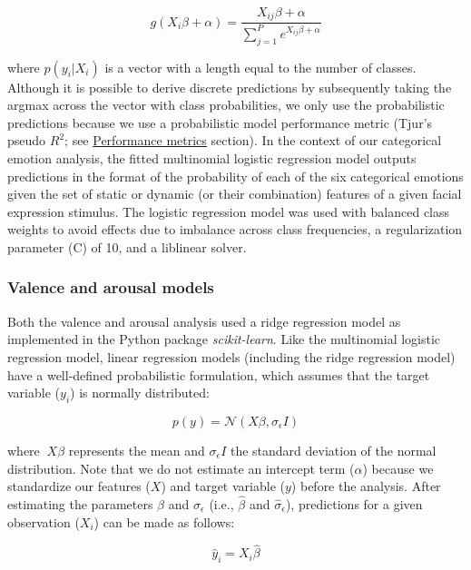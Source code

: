 \documentclass[11pt,american,]{memoir} %
\begin{document}
\begin{equation}
g(X_{i}\beta + \alpha) = \frac{X_{ij}\beta + \alpha}{\sum_{j=1}^{P}e^{X_{ij}\beta + \alpha}}
\end{equation}

where \(p(y_{i} | X_{i})\) is a vector with a length equal to the number of classes. Although it is possible to derive discrete predictions by subsequently taking the argmax across the vector with class probabilities, we only use the probabilistic predictions because we use a probabilistic model performance metric (Tjur's pseudo \(R^{2}\); see \protect\hyperlink{svsd-perf}{Performance metrics} section). In the context of our categorical emotion analysis, the fitted multinomial logistic regression model outputs predictions in the format of the probability of each of the six categorical emotions given the set of static or dynamic (or their combination) features of a given facial expression stimulus. The logistic regression model was used with balanced class weights to avoid effects due to imbalance across class frequencies, a regularization parameter (C) of 10, and a liblinear solver.

\hypertarget{svsd-valaro}{%
\subsubsection{Valence and arousal models}\label{svsd-valaro}}

Both the valence and arousal analysis used a ridge regression model as implemented in the Python package \emph{scikit-learn}. Like the multinomial logistic regression model, linear regression models (including the ridge regression model) have a well-defined probabilistic formulation, which assumes that the target variable (\(y_{i}\)) is normally distributed:

\begin{equation}
p(y) = \mathcal{N}(X\beta, \sigma_{\epsilon}I)
\end{equation}

where \(~X\beta\) represents the mean and \(\sigma_{\epsilon}I\) the standard deviation of the normal distribution. Note that we do not estimate an intercept term (\(\alpha\)) because we standardize our features (\(X\)) and target variable (\(y\)) before the analysis. After estimating the parameters \(\beta\) and \(\sigma_{\epsilon}\) (i.e., \(\hat{\beta}\) and \(\hat{\sigma}_{\epsilon}\)), predictions for a given observation (\(X_{i}\)) can be made as follows:

\begin{equation}
\hat{y}_{i} = X_{i}\hat{\beta}
\end{equation}
\end{document}
